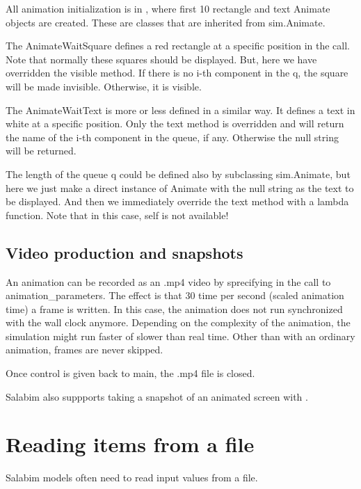 \documentclass[letterpaper,10pt,english]{sphinxmanual}
\begin{document}
All animation initialization is in , where first 10 rectangle and text Animate
objects are created. These are classes that are inherited from sim.Animate.

The AnimateWaitSquare defines a red rectangle at a specific position in the  call.
Note that normally these squares should be displayed. But, here we have overridden the visible method.
If there is no i-th component in the q, the square will be made invisible. Otherwise, it is visible.

The AnimateWaitText is more or less defined in a similar way. It defines a text in white at a specific position.
Only the text method is overridden and will return the name of the i-th component in the queue, if any. Otherwise
the null string will be returned.

The length of the queue q could be defined also by subclassing sim.Animate, but here we just make a direct instance
of Animate with the null string as the text to be displayed. And then we immediately override the text method with
a lambda function. Note that in this case, self is not available!


\section{Video production and snapshots}
\label{\detokenize{Animation:video-production-and-snapshots}}
An animation can be recorded as an .mp4 video by sprecifying  in the call to animation\_parameters.
The effect is that 30 time per second (scaled animation time) a frame is written. In this case, the animation does not
run synchronized with the wall clock anymore. Depending on the complexity of the animation, the simulation might run
faster of slower than real time. Other than with an ordinary animation, frames are never skipped.

Once control is given back to main, the .mp4 file is closed.

Salabim also suppports taking a snapshot of an animated screen with .


\chapter{Reading items from a file}
\label{\detokenize{Reading items from a file:reading-items-from-a-file}}\label{\detokenize{Reading items from a file::doc}}
Salabim models often need to read input values from a file.
\end{document}
